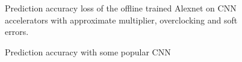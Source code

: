 \begin{figure}
    \caption{Prediction accuracy loss of the offline trained Alexnet on CNN accelerators with approximate multiplier, overclocking and soft errors.}
\label{fig:loss}
\vspace{-1em}
\end{figure}

\begin{figure}
    \caption{Prediction accuracy with some popular CNN}
\label{fig:loss}
\vspace{-1em}
\end{figure}
